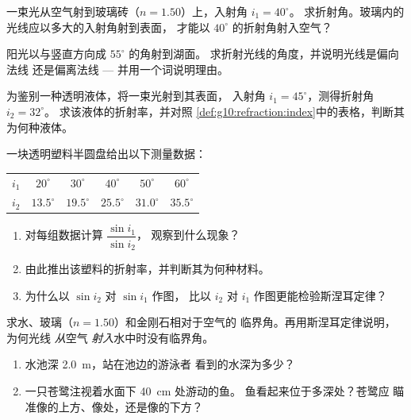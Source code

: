 \begin{exercise}[$\star$]\label{exo:g10:refraction:3}
一束光从空气射到玻璃砖（$n = 1.50$）上，入射角 $i_1 = 40^\circ$。
求折射角。玻璃内的光线应以多大的入射角射到表面，
才能以
$40^\circ$ 的折射角射入空气？
\end{exercise}

\begin{exercise}[$\star$]\label{exo:g10:refraction:4}
阳光以与竖直方向成 $55^\circ$ 的角射到湖面。
求折射光线的角度，并说明光线是偏向法线
还是偏离法线 --- 并用一个词说明理由。
\end{exercise}

\begin{exercise}[$\star$]\label{exo:g10:refraction:5}
为鉴别一种透明液体，将一束光射到其表面，
入射角 $i_1 = 45^\circ$，测得折射角 $i_2 = 32^\circ$。
求该液体的折射率，并对照
\cref{def:g10:refraction:index}中的表格，判断其为何种液体。
\end{exercise}

\begin{exercise}[$\star\star$]\label{exo:g10:refraction:6}
一块透明塑料半圆盘给出以下测量数据：
\begin{center}
\begin{tabular}{lccccc}
$i_1$ & $20^\circ$ & $30^\circ$ & $40^\circ$ & $50^\circ$ & $60^\circ$ \\
$i_2$ & $13.5^\circ$ & $19.5^\circ$ & $25.5^\circ$ & $31.0^\circ$
      & $35.5^\circ$ \\
\end{tabular}
\end{center}
\begin{enumerate}
  \item 对每组数据计算 $\dfrac{\sin i_1}{\sin i_2}$，
        观察到什么现象？
  \item 由此推出该塑料的折射率，并判断其为何种材料。
  \item 为什么以 $\sin i_2$ 对 $\sin i_1$ 作图，
        比以 $i_2$ 对 $i_1$ 作图更能检验斯涅耳定律？
\end{enumerate}
\end{exercise}

\begin{exercise}[$\star\star$]\label{exo:g10:refraction:7}
求水、玻璃（$n = 1.50$）和金刚石相对于空气的
临界角。再用斯涅耳定律说明，为何光线 \emph{从}空气
\emph{射入}水中时没有临界角。
\end{exercise}

\begin{exercise}[$\star\star$]\label{exo:g10:refraction:8}
\begin{enumerate}
  \item 水池深 \qty{2.0}{m}，站在池边的游泳者
        看到的水深为多少？
  \item 一只苍鹭注视着水面下 \qty{40}{cm} 处游动的鱼。
        鱼看起来位于多深处？苍鹭应
        瞄准像的上方、像处，还是像的下方？
\end{enumerate}
\end{exercise}

